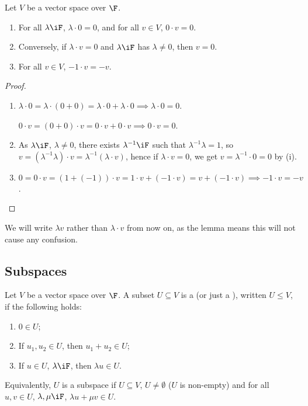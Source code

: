 \vspace{-1pt}

\begin{lemma}
	Let $V$ be a vector space over $\F$. %
	\begin{enumerate}
		\shortskip
		\item For all $\lambda\iF$, $\lambda\cdot0=0$, and for all $v\in V$, $0\cdot v = 0$.
		\item Conversely, if $\lambda\cdot v = 0$ and $\lambda\iF$ has $\lambda\neq 0$, then $v=0$. %
	\item For all $v\in V$, $-1\cdot v=-v$.

	\end{enumerate}
\end{lemma}

\begin{proof}
\mbox{}
\begin{enumerate}
	\shortskip
	\item $\lambda\cdot 0 = \lambda \cdot \left( 0+0 \right)=\lambda\cdot 0 + \lambda\cdot 0 \implies \lambda\cdot 0 = 0$. %
	
	$0\cdot v = \left( 0+0 \right)\cdot v = 0\cdot v + 0\cdot v \implies 0\cdot v = 0$.
	
	\item As $\lambda\iF$, $\lambda\neq 0$, there exists $\lambda^{-1}\iF$ such that $\lambda^{-1}\lambda=1$, so $v=(\lambda^{-1}\lambda)\cdot v = \lambda^{-1}\left( \lambda\cdot v \right)$, hence if $\lambda\cdot v=0$, we get $v=\lambda^{-1}\cdot 0 = 0$ by (i). 

	\item %
	$0=0\cdot v = (1+(-1)) \cdot v = 1\cdot v + (- 1 \cdot v) = v + (-1\cdot v) \implies -1 \cdot v = -v$. \qedhere %
\end{enumerate} %
\end{proof}

We will write $\lambda v $ rather than $\lambda \cdot v$ from now on, as the lemma means this will not cause any confusion.


	\pagebreak

\subsection{Subspaces} %
\label{sub:subspaces}

\begin{definition}
	Let $V$ be a vector space over $\F$. A subset $U\subseteq V$ is a  (or just a ), written $U\leq V$, if the following holds: %
	\begin{enumerate}
		\shortskip
		\item $0\in U$;
		\item If $u_1,u_2\in U$, then $u_1+u_2\in U$;
		\item If $u\in U$, $\lambda\iF$, then $\lambda u\in U$.
	\end{enumerate}
	Equivalently, $U$ is a subspace if $U\subseteq V$, $U\neq \emptyset$ ($U$ is non-empty) and for all $u,v \in U$, $\lambda, \mu \iF$, $\lambda u + \mu v \in U$. %
\end{definition}

